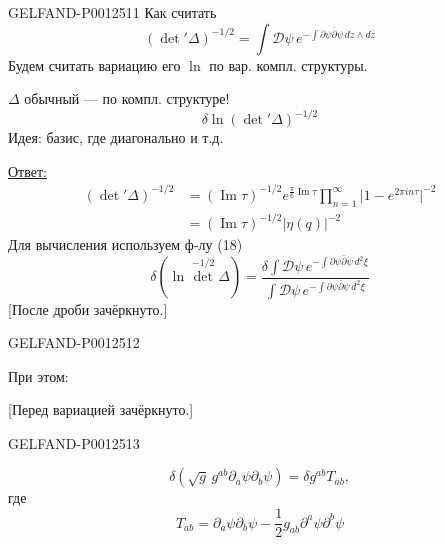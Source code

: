 \begin{GelfandAdjacentEvidence}{GELFAND-P001251}{1}
Как считать
\begin{equation*}
(\det'\Delta)^{-1/2}
=\int\mathcal D\psi\,e^{-\int\partial\psi\bar\partial\psi\,dz\wedge d\bar z}\tag{18}
\end{equation*}
Будем считать вариацию его $\ln$ по вар. компл. структуры.

$\Delta$ обычный — по компл. структуре!
\begin{equation*}
\delta\ln(\det'\Delta)^{-1/2}\tag{19}
\end{equation*}
Идея: базис, где диагонально и т.д.

\underline{Ответ:}
\begin{equation*}
\begin{aligned}
(\det'\Delta)^{-1/2}
&=(\operatorname{Im}\tau)^{-1/2}e^{\frac{\pi}{6}\operatorname{Im}\tau}
\prod_{n=1}^{\infty}\lvert1-e^{2\pi in\tau}\rvert^{-2}\\
&=(\operatorname{Im}\tau)^{-1/2}\lvert\eta(q)\rvert^{-2}
\end{aligned}\tag{20}
\end{equation*}
Для вычисления используем ф-лу (18)
\begin{equation*}
\delta(\ln\det^{-1/2}\Delta)
=\frac{\delta\int\mathcal D\psi\,e^{-\int\partial\psi\bar\partial\psi\,d^2\xi}}
{\int\mathcal D\psi\,e^{-\int\partial\psi\bar\partial\psi\,d^2\xi}}\tag{21}
\end{equation*}
[После дроби зачёркнуто.]
\end{GelfandAdjacentEvidence}
\begin{GelfandAdjacentEvidence}{GELFAND-P001251}{2}


При этом:

[Перед вариацией зачёркнуто.]
\end{GelfandAdjacentEvidence}
\begin{GelfandAdjacentEvidence}{GELFAND-P001251}{3}

\begin{equation*}
\delta(\sqrt g\,g^{ab}\partial_a\psi\partial_b\psi)=\delta g^{ab}T_{ab},
\end{equation*}
где
\begin{equation*}
T_{ab}=\partial_a\psi\partial_b\psi-\frac12g_{ab}\partial^a\psi\partial^b\psi
\end{equation*}
\end{GelfandAdjacentEvidence}
